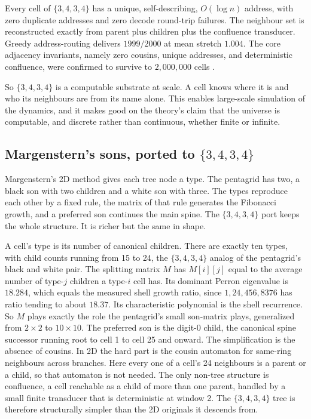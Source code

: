 \begin{result}
Every cell of $\{3,4,3,4\}$ has a unique, self-describing, $O(\log n)$ address, with zero duplicate addresses and zero decode round-trip failures. The neighbour set is reconstructed exactly from parent plus children plus the confluence transducer. Greedy address-routing delivers $1999/2000$ at mean stretch $1.004$. The core adjacency invariants, namely zero cousins, unique addresses, and deterministic confluence, were confirmed to survive to $2{,}000{,}000$ cells \cite{pollard2026vibetest}.
\end{result}

So $\{3,4,3,4\}$ is a computable substrate at scale. A cell knows where it is and who its neighbours are from its name alone. This enables large-scale simulation of the dynamics, and it makes good on the theory's claim that the universe is computable, and discrete rather than continuous, whether finite or infinite.

\subsection{Margenstern's sons, ported to $\{3,4,3,4\}$}

Margenstern's 2D method gives each tree node a type. The pentagrid has two, a black son with two children and a white son with three. The types reproduce each other by a fixed rule, the matrix of that rule generates the Fibonacci growth, and a preferred son continues the main spine. The $\{3,4,3,4\}$ port keeps the whole structure. It is richer but the same in shape.

A cell's type is its number of canonical children. There are exactly ten types, with child counts running from 15 to 24, the $\{3,4,3,4\}$ analog of the pentagrid's black and white pair. The splitting matrix $M$ has $M[i][j]$ equal to the average number of type-$j$ children a type-$i$ cell has. Its dominant Perron eigenvalue is $18.284$, which equals the measured shell growth ratio, since $1, 24, 456, 8376$ has ratio tending to about $18.37$. Its characteristic polynomial is the shell recurrence. So $M$ plays exactly the role the pentagrid's small son-matrix plays, generalized from $2 \times 2$ to $10 \times 10$. The preferred son is the digit-0 child, the canonical spine successor running root to cell 1 to cell 25 and onward. The simplification is the absence of cousins. In 2D the hard part is the cousin automaton for same-ring neighbours across branches. Here every one of a cell's 24 neighbours is a parent or a child, so that automaton is not needed. The only non-tree structure is confluence, a cell reachable as a child of more than one parent, handled by a small finite transducer that is deterministic at window 2. The $\{3,4,3,4\}$ tree is therefore structurally simpler than the 2D originals it descends from.

